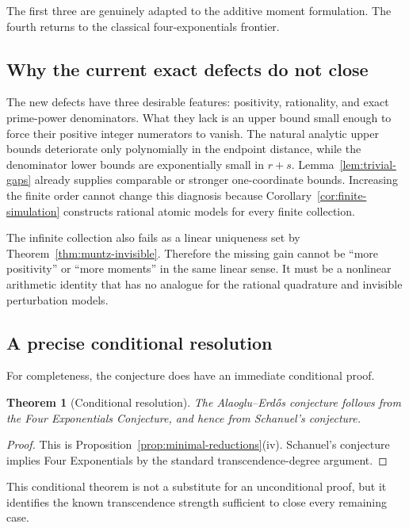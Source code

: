 \documentclass[11pt,oneside]{article}
\newtheorem{theorem}{Theorem}[section]
\theoremstyle{definition}
\theoremstyle{remark}
\newcommand{\AEname}{Alaoglu--Erd\H{o}s}
\begin{document}
The first three are genuinely adapted to the additive moment formulation.  The fourth returns
to the classical four-exponentials frontier.

\subsection{Why the current exact defects do not close}

The new defects have three desirable features: positivity, rationality, and exact
prime-power denominators.  What they lack is an upper bound small enough to force their
positive integer numerators to vanish.  The natural analytic upper bounds deteriorate only
polynomially in the endpoint distance, while the denominator lower bounds are exponentially
small in $r+s$.  Lemma~\ref{lem:trivial-gaps} already supplies comparable or stronger
one-coordinate bounds.  Increasing the finite order cannot change this diagnosis because
Corollary~\ref{cor:finite-simulation} constructs rational atomic models for every finite
collection.

The infinite collection also fails as a linear uniqueness set by
Theorem~\ref{thm:muntz-invisible}.  Therefore the missing gain cannot be ``more positivity''
or ``more moments'' in the same linear sense.  It must be a nonlinear arithmetic identity
that has no analogue for the rational quadrature and invisible perturbation models.

\subsection{A precise conditional resolution}

For completeness, the conjecture does have an immediate conditional proof.

\begin{theorem}[Conditional resolution]\label{thm:conditional-resolution}
The \AEname{} conjecture follows from the Four Exponentials Conjecture, and hence from Schanuel's
conjecture.
\end{theorem}

\begin{proof}
This is Proposition~\ref{prop:minimal-reductions}(iv).  Schanuel's conjecture implies Four
Exponentials by the standard transcendence-degree argument.
\end{proof}

This conditional theorem is not a substitute for an unconditional proof, but it identifies the
known transcendence strength sufficient to close every remaining case.
\end{document}
